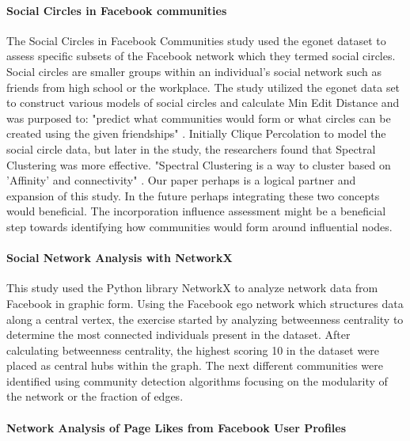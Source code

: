 \documentclass[11pt,twocolumn]{article}
\begin{document}
\paragraph{Social Circles in Facebook communities \cite{social-network-networkx}}   

The Social Circles in Facebook Communities study used the egonet dataset to assess specific subsets of the Facebook network which they termed social circles. Social circles are smaller groups within an individual's social network such as friends from high school or the workplace. The study utilized the egonet data set to construct various models of social circles and calculate Min Edit Distance and was purposed to: "predict what communities would form or what circles can be created using the given friendships" \cite{social-network-networkx}. Initially Clique Percolation to model the social circle data, but later in the study, the researchers found that Spectral Clustering was more effective. "Spectral Clustering is a way to cluster based on 'Affinity' and connectivity" \cite{social-network-networkx}. Our paper perhaps is a logical partner and expansion of this study. In the future perhaps integrating these two concepts would beneficial. The incorporation influence assessment might be a beneficial step towards identifying how communities would form around influential nodes.


\paragraph{Social Network Analysis with NetworkX \cite{social-network-networkx}}

This study used the Python library NetworkX to analyze network data from Facebook in graphic form. Using the Facebook ego network which structures data along a central vertex, the exercise started by analyzing betweenness centrality to determine the most connected individuals present in the dataset. After calculating betweenness centrality, the highest scoring 10 in the dataset were placed as central hubs within the graph. The next different communities were identified using community detection algorithms focusing on the modularity of the network or the fraction of edges. 

\paragraph{Network Analysis of Page Likes from Facebook User Profiles \cite{page-likes-facebook}}
\end{document}
